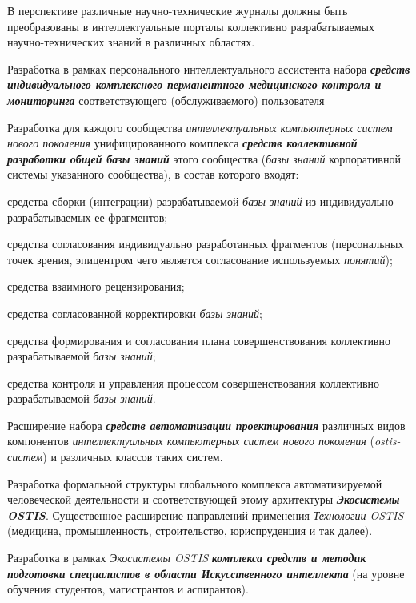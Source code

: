 \begin{textitemize}
\begin{textitemize}
		В перспективе различные научно-технические журналы должны быть преобразованы в интеллектуальные порталы коллективно разрабатываемых научно-технических знаний в различных областях.
	\end{textitemize}
	\item
	Разработка в рамках персонального интеллектуального ассистента набора \textbf{\textit{средств индивидуального комплексного перманентного медицинского контроля и мониторинга}} соответствующего (обслуживаемого) пользователя
	\medskip
	\item Разработка для каждого сообщества \textit{интеллектуальных компьютерных систем нового поколения} унифицированного комплекса \textbf{\textit{средств коллективной разработки общей базы знаний}} этого сообщества (\textit{базы знаний} корпоративной системы указанного сообщества), в состав которого входят:
	\begin{textitemize}
		\item средства сборки (интеграции) разрабатываемой \textit{базы знаний} из индивидуально разрабатываемых ее фрагментов;
		\item средства согласования индивидуально разработанных фрагментов (персональных точек зрения, эпицентром чего является согласование используемых \textit{понятий});
		\item средства взаимного рецензирования;
		\item средства согласованной корректировки \textit{базы знаний};
		\item средства формирования и согласования плана совершенствования коллективно разрабатываемой \textit{базы знаний};
		\item средства контроля и управления процессом совершенствования коллективно разрабатываемой \textit{базы знаний}.
	\end{textitemize}
	\item Расширение набора \textbf{\textit{средств автоматизации проектирования}} различных видов компонентов \textit{интеллектуальных компьютерных систем нового поколения} (\textit{ostis-систем}) и различных классов таких систем.
	\medskip
	\item Разработка формальной структуры глобального комплекса автоматизируемой человеческой деятельности и соответствующей этому архитектуры \textbf{\textit{Экосистемы OSTIS}}. Существенное расширение направлений применения \textit{Технологии OSTIS} (медицина, промышленность, строительство, юриспруденция и так далее).
	\medskip
	\item Разработка в рамках \textit{Экосистемы OSTIS} \textbf{\textit{комплекса средств и методик подготовки специалистов в области Искусственного интеллекта}} (на уровне обучения студентов, магистрантов и аспирантов).

\end{textitemize}
